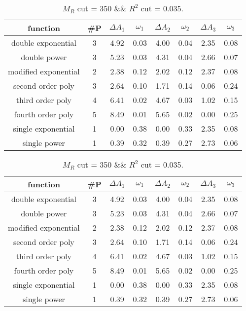  
\begin{table}[H] 
\begin{center} 
\begin{tabular}{|c|c|cc|cc|cc|} 
\hline function & \#P & $\Delta A_1$ & $\omega_1$ & $\Delta A_2$ & $\omega_2$ & $\Delta A_3$ & $\omega_3$ \\ \hline 
double exponential &  3 &   4.92 &   0.03 &   4.00 &   0.04 &   2.35 &   0.08 \\ 
double power &  3 &   5.23 &   0.03 &   4.31 &   0.04 &   2.66 &   0.07 \\ 
modified exponential &  2 &   2.38 &   0.12 &   2.02 &   0.12 &   2.37 &   0.08 \\ 
second order poly &  3 &   2.64 &   0.10 &   1.71 &   0.14 &   0.06 &   0.24 \\ 
third order poly &  4 &   6.41 &   0.02 &   4.67 &   0.03 &   1.02 &   0.15 \\ 
fourth order poly &  5 &   8.49 &   0.01 &   5.65 &   0.02 &   0.00 &   0.25 \\ 
single exponential &  1 &   0.00 &   0.38 &   0.00 &   0.33 &   2.35 &   0.08 \\ 
single power &  1 &   0.39 &   0.32 &   0.39 &   0.27 &   2.73 &   0.06 \\ 
\hline 
\end{tabular} 
\caption{$M_R$ cut = 350 \&\& $R^2$ cut = 0.035.} 
\label{tab:FitChoices_350_0.035} 
\end{center} 
\end{table} 
 
 
\begin{table}[H] 
\begin{center} 
\begin{tabular}{|c|c|cc|cc|cc|} 
\hline function & \#P & $\Delta A_1$ & $\omega_1$ & $\Delta A_2$ & $\omega_2$ & $\Delta A_3$ & $\omega_3$ \\ \hline 
double exponential &  3 &   4.92 &   0.03 &   4.00 &   0.04 &   2.35 &   0.08 \\ 
double power &  3 &   5.23 &   0.03 &   4.31 &   0.04 &   2.66 &   0.07 \\ 
modified exponential &  2 &   2.38 &   0.12 &   2.02 &   0.12 &   2.37 &   0.08 \\ 
second order poly &  3 &   2.64 &   0.10 &   1.71 &   0.14 &   0.06 &   0.24 \\ 
third order poly &  4 &   6.41 &   0.02 &   4.67 &   0.03 &   1.02 &   0.15 \\ 
fourth order poly &  5 &   8.49 &   0.01 &   5.65 &   0.02 &   0.00 &   0.25 \\ 
single exponential &  1 &   0.00 &   0.38 &   0.00 &   0.33 &   2.35 &   0.08 \\ 
single power &  1 &   0.39 &   0.32 &   0.39 &   0.27 &   2.73 &   0.06 \\ 
\hline 
\end{tabular} 
\caption{$M_R$ cut = 350 \&\& $R^2$ cut = 0.035.} 
\label{tab:FitChoices_350_0.035} 
\end{center} 
\end{table} 
 
